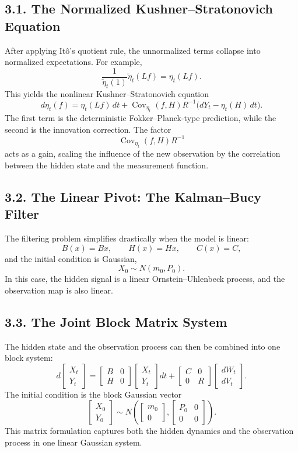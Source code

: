 \documentclass[11pt]{article}
\theoremstyle{definition}
\theoremstyle{remark}
\begin{document}
\subsection*{3.1. The Normalized Kushner--Stratonovich Equation}
After applying It\^o's quotient rule, the unnormalized terms collapse into normalized expectations. For example,
\[
\frac{1}{\widetilde\eta_t(1)}\widetilde\eta_t(Lf)=\eta_t(Lf).
\]
This yields the nonlinear Kushner--Stratonovich equation
\[
d\eta_t(f)
=
\eta_t(Lf)\,dt
+
\operatorname{Cov}_{\eta_t}(f,H)R^{-1}
\bigl(dY_t-\eta_t(H)\,dt\bigr).
\]
The first term is the deterministic Fokker--Planck-type prediction, while the second is the innovation correction. The factor
\[
\operatorname{Cov}_{\eta_t}(f,H)R^{-1}
\]
acts as a gain, scaling the influence of the new observation by the correlation between the hidden state and the measurement function.

\subsection*{3.2. The Linear Pivot: The Kalman--Bucy Filter}
The filtering problem simplifies drastically when the model is linear:
\[
B(x)=Bx,\qquad H(x)=Hx,\qquad C(x)=C,
\]
and the initial condition is Gaussian,
\[
X_0\sim N(m_0,P_0).
\]
In this case, the hidden signal is a linear Ornstein--Uhlenbeck process, and the observation map is also linear.

\subsection*{3.3. The Joint Block Matrix System}
The hidden state and the observation process can then be combined into one block system:
\[
d
\begin{bmatrix}
X_t\\
Y_t
\end{bmatrix}
=
\begin{bmatrix}
B & 0\\
H & 0
\end{bmatrix}
\begin{bmatrix}
X_t\\
Y_t
\end{bmatrix}
dt
+
\begin{bmatrix}
C & 0\\
0 & R
\end{bmatrix}
\begin{bmatrix}
dW_t\\
dV_t
\end{bmatrix}.
\]
The initial condition is the block Gaussian vector
\[
\begin{bmatrix}
X_0\\
Y_0
\end{bmatrix}
\sim
N\left(
\begin{bmatrix}
m_0\\
0
\end{bmatrix},
\begin{bmatrix}
P_0 & 0\\
0 & 0
\end{bmatrix}
\right).
\]
This matrix formulation captures both the hidden dynamics and the observation process in one linear Gaussian system.
\end{document}
